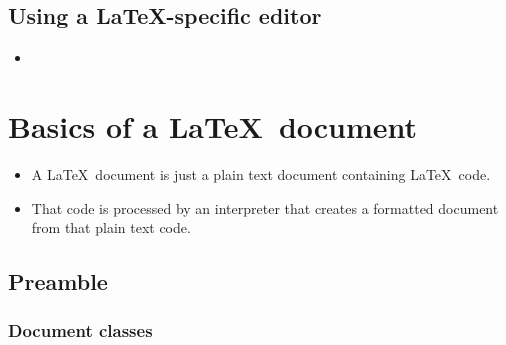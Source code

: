 \documentclass[11pt, letterpaper]{article}
\begin{document}
  \subsection{Using a \LaTeX-specific editor}
  
    \begin{itemize}
      \item 
    \end{itemize}

      
  \section{Basics of a \LaTeX\ document}
  
    \begin{itemize}
      \item A \LaTeX\ document is just a plain text document containing \LaTeX\ code.
      
      \item That code is processed by an interpreter that creates a formatted document from that plain text code.
    \end{itemize}

  
  \subsection{Preamble}
  
  \subsubsection{Document classes}
  
\end{document}
